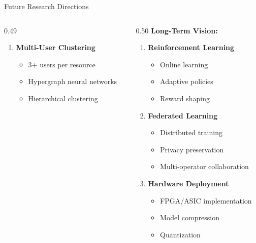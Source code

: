 \documentclass[aspectratio=169]{beamer}
\begin{document}
\begin{frame}{Future Research Directions}
\begin{columns}[T]
\begin{column}{0.49\textwidth}
\begin{enumerate}
                \item \textbf{Multi-User Clustering}
                \begin{itemize}\itemsep0em
                    \item 3+ users per resource
                    \item Hypergraph neural networks
                    \item Hierarchical clustering
                \end{itemize}
            \end{enumerate}
        \end{column}
        \begin{column}{0.50\textwidth}
            \textbf{Long-Term Vision:}
            \begin{enumerate}\itemsep0.15em
                \setcounter{enumi}{4}
                \item \textbf{Reinforcement Learning}
                \begin{itemize}\itemsep0em
                    \item Online learning
                    \item Adaptive policies
                    \item Reward shaping
                \end{itemize}
                
                \item \textbf{Federated Learning}
                \begin{itemize}\itemsep0em
                    \item Distributed training
                    \item Privacy preservation
                    \item Multi-operator collaboration
                \end{itemize}
                
                \item \textbf{Hardware Deployment}
                \begin{itemize}\itemsep0em
                    \item FPGA/ASIC implementation
                    \item Model compression
                    \item Quantization
                \end{itemize}
                

\end{enumerate}
\end{column}
\end{columns}
\end{frame}
\end{document}
